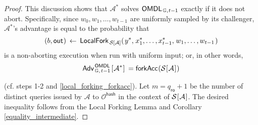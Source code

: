 \documentclass{iacrtrans}
\begin{document}
\begin{proof}
This discussion shows that $\mathcal{A}^*$ solves
$\mathsf{OMDL}
	_{\hspace{1pt}\mathbb{G},\hspace{0.5pt} t-1}$
exactly if it does not abort.
Specifically, since $w_0, w_1, \dots, w_{t-1}$
are uniformly sampled by its challenger,
$\mathcal{A}^*$'s advantage is equal to the probability that
\vspace{5pt}
\begin{equation*}
    		(
				\vspace{1pt}
				b,
				\vspace{1pt}
				\mathsf{out}
				\hspace{0.5pt}
			)
			\hspace{2pt}
			\leftarrow
			\hspace{2pt}
    		\mathsf{LocalFork}_{
				\hspace{1pt}
    			\mathcal{S}
    			\hspace{0pt}[
    				\hspace{0pt}
    				\mathcal{A}
    				\hspace{0pt}
    			]
    		}
			(
   				\hspace{1pt}
				y ^*,
				\hspace{1pt}
				x_1^*, \dots, x_{t-1}^*,
				\hspace{1pt}
				w_1, \dots, w_{t-1}
				\hspace{1pt}
   			)
\vspace{5pt}
\end{equation*}
\noindent
is a non-aborting execution when run
with uniform input; or, in other words,
\vspace{5pt}
\begin{equation*}
	\mathsf{Adv}
		_{\hspace{1pt}\mathbb{G},\hspace{1pt} t-1}
		^{\hspace{1pt}\mathsf{OMDL}}
		\hspace{1pt}
		[
			\hspace{0.5pt}
			\mathcal{A}^*
			\hspace{0.5pt}
		]
	\hspace{2pt}
	=
	\mathsf{forkAcc}
		\hspace{0.5pt}
		(
			\mathcal{S}
			\hspace{0.5pt}
			[
				\hspace{0.5pt}
				\mathcal{A}
				\hspace{0.5pt}
			]
			\hspace{0.5pt}
		)
\vspace{5pt}
\end{equation*}

\noindent
(cf. steps 1-2 and \eqref{local_forking_forkacc}).
Let $m = q_{\mathsf{ro}} + 1$ be the number of distinct
queries issued by $\mathcal{A}$ to $\mathcal{O}^{\mathsf{hash}}$
in the context of
$\mathcal{S}\hspace{0.5pt}[\hspace{0.5pt}\mathcal{A}\hspace{0.5pt}]$.
The desired inequality follows from the
Local Forking Lemma
and Corollary \ref{equality_intermediate}.
\end{proof}
\end{document}

